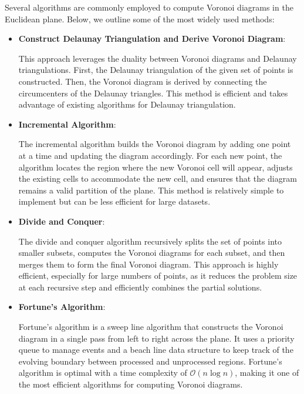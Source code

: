 \documentclass[minted, draw]{hebdomon}
\begin{document}

Several algorithms are commonly employed to compute Voronoi diagrams in the Euclidean plane. Below, we outline some of the most widely used methods:

\begin{itemize}
    \item \textbf{Construct Delaunay Triangulation and Derive Voronoi Diagram}:
    
    This approach leverages the duality between Voronoi diagrams and Delaunay triangulations. First, the Delaunay triangulation of the given set of points is constructed. Then, the Voronoi diagram is derived by connecting the circumcenters of the Delaunay triangles. This method is efficient and takes advantage of existing algorithms for Delaunay triangulation.
    
    \item \textbf{Incremental Algorithm}:
    
    The incremental algorithm builds the Voronoi diagram by adding one point at a time and updating the diagram accordingly. For each new point, the algorithm locates the region where the new Voronoi cell will appear, adjusts the existing cells to accommodate the new cell, and ensures that the diagram remains a valid partition of the plane. This method is relatively simple to implement but can be less efficient for large datasets.
    
    \item \textbf{Divide and Conquer}:
    
    The divide and conquer algorithm recursively splits the set of points into smaller subsets, computes the Voronoi diagrams for each subset, and then merges them to form the final Voronoi diagram. This approach is highly efficient, especially for large numbers of points, as it reduces the problem size at each recursive step and efficiently combines the partial solutions.
    
    \item \textbf{Fortune's Algorithm}:
    
    Fortune's algorithm is a sweep line algorithm that constructs the Voronoi diagram in a single pass from left to right across the plane. It uses a priority queue to manage events and a beach line data structure to keep track of the evolving boundary between processed and unprocessed regions. Fortune's algorithm is optimal with a time complexity of $\mathcal{O}(n \log n)$, making it one of the most efficient algorithms for computing Voronoi diagrams.
\end{itemize}
\end{document}
